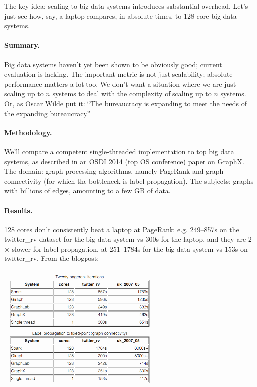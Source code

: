 \documentclass[a4paper]{report}
\begin{document}
The key idea: scaling to big data systems introduces substantial overhead. Let's just see how, say, a laptop compares, in absolute times, to 128-core big data systems.

\paragraph{Summary.} Big data systems haven't yet been shown to be obviously good; current evaluation is lacking.
The important metric is not just scalability; absolute
performance matters a lot too. We don't want a situation where we are just scaling up to $n$ systems to deal with the complexity of scaling up to $n$ systems. Or, as Oscar Wilde put it: ``The bureaucracy is expanding to meet the needs of the expanding bureaucracy.''

\paragraph{Methodology.} We'll compare a competent single-threaded implementation to top
big data systems, as described in an OSDI 2014 (top OS conference) paper on GraphX\cite{graphx}. The domain: graph processing
algorithms, namely PageRank and graph connectivity (for which the bottleneck is label propagation). The subjects: graphs with billions of edges, amounting to a few
GB of data.

\paragraph{Results.} 128 cores don't consistently beat a laptop at PageRank: e.g. 249--857s on the twitter\_rv dataset for the big data system vs 300s for the laptop, and they are 2$\times$ slower for label
propagation, at 251--1784s for the big data system vs 153s on
twitter\_rv. From the blogpost:

\begin{center}
	\includegraphics[width=0.60\textwidth]{images/pagerank.png}
\end{center}
\end{document}
